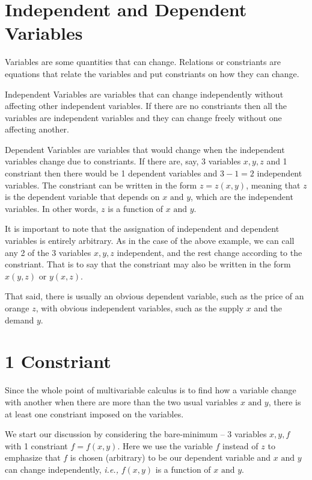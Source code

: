\documentclass[english,a4paper,12pt]{report}
\begin{document}
\section{Independent and Dependent Variables}

Variables are some quantities that can change. Relations or constriants are equations that relate the variables and put constriants on how they can change. 

Independent Variables are variables that can change independently without affecting other independent variables. If there are no constriants then all the variables are independent variables and they can change freely without one affecting another.

Dependent Variables are variables that would change when the independent variables change due to constriants. If there are, say, 3 variables \(x,y,z\) and 1 constriant then there would be 1 dependent variables and \(3-1=2\) independent variables. The constriant can be written in the form \(z = z(x,y)\), meaning that \(z\) is the dependent variable that depends on \(x \text { and } y\), which are the independent variables. In other words, \(z\) is a function of \(x \text { and } y\).   

It is important to note that the assignation of independent and dependent variables is entirely arbitrary. As in the case of the above example, we can call any 2 of the 3 variables \(x,y,z\) independent, and the rest change according to the constriant. That is to say that the constriant may also be written in the form \(x(y,z) \text { or } y(x,z)\). 

That said, there is usually an obvious dependent variable, such as the price of an orange \(z\), with obvious independent variables, such as the supply \(x\) and the demand \(y\).  

\section{1 Constriant}

Since the whole point of multivariable calculus is to find how a variable change with another when there are more than the two usual variables \(x \text { and } y\), there is at least one constriant imposed on the variables. 

We start our discussion by considering the bare-minimum -- 3 variables \(x,y,f\) with 1 constriant \(f = f(x,y)\). Here we use the variable \(f\) instead of \(z\) to emphasize that \(f\) is chosen (arbitrary) to be our dependent variable and \(x \text { and } y\) can change independently, \textit{i.e.,} \(f(x,y)\) is a function of \(x \text { and } y\).  
\end{document}
